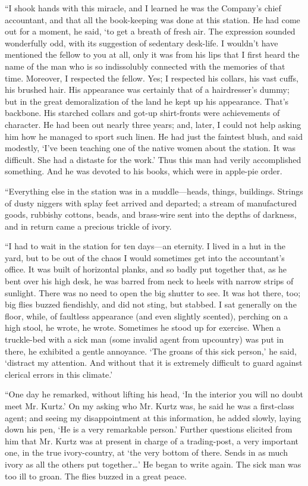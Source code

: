 \documentclass[12pt]{report}
\begin{document}
``I shook hands with this miracle, and I learned he was the Company's
chief accountant, and that all the book-keeping was done at this
station. He had come out for a moment, he said, `to get a breath of
fresh air. The expression sounded wonderfully odd, with its suggestion
of sedentary desk-life. I wouldn't have mentioned the fellow to you at
all, only it was from his lips that I first heard the name of the man
who is so indissolubly connected with the memories of that time.
Moreover, I respected the fellow. Yes; I respected his collars, his vast
cuffs, his brushed hair. His appearance was certainly that of a
hairdresser's dummy; but in the great demoralization of the land he kept
up his appearance. That's backbone. His starched collars and got-up
shirt-fronts were achievements of character. He had been out nearly
three years; and, later, I could not help asking him how he managed to
sport such linen. He had just the faintest blush, and said modestly,
`I've been teaching one of the native women about the station. It was
difficult. She had a distaste for the work.' Thus this man had verily
accomplished something. And he was devoted to his books, which were in
apple-pie order.

``Everything else in the station was in a muddle---heads, things,
buildings. Strings of dusty niggers with splay feet arrived and
departed; a stream of manufactured goods, rubbishy cottons, beads, and
brass-wire sent into the depths of darkness, and in return came a
precious trickle of ivory.

``I had to wait in the station for ten days---an eternity. I lived in a
hut in the yard, but to be out of the chaos I would sometimes get into
the accountant's office. It was built of horizontal planks, and so badly
put together that, as he bent over his high desk, he was barred from
neck to heels with narrow strips of sunlight. There was no need to open
the big shutter to see. It was hot there, too; big flies buzzed
fiendishly, and did not sting, but stabbed. I sat generally on the
floor, while, of faultless appearance (and even slightly scented),
perching on a high stool, he wrote, he wrote. Sometimes he stood up for
exercise. When a truckle-bed with a sick man (some invalid agent from
upcountry) was put in there, he exhibited a gentle annoyance. `The
groans of this sick person,' he said, `distract my attention. And
without that it is extremely difficult to guard against clerical errors
in this climate.'

``One day he remarked, without lifting his head, `In the interior you
will no doubt meet Mr. Kurtz.' On my asking who Mr. Kurtz was, he said
he was a first-class agent; and seeing my disappointment at this
information, he added slowly, laying down his pen, `He is a very
remarkable person.' Further questions elicited from him that Mr. Kurtz
was at present in charge of a trading-post, a very important one, in the
true ivory-country, at `the very bottom of there. Sends in as much ivory
as all the others put together\ldots{}' He began to write again. The
sick man was too ill to groan. The flies buzzed in a great peace.
\end{document}
